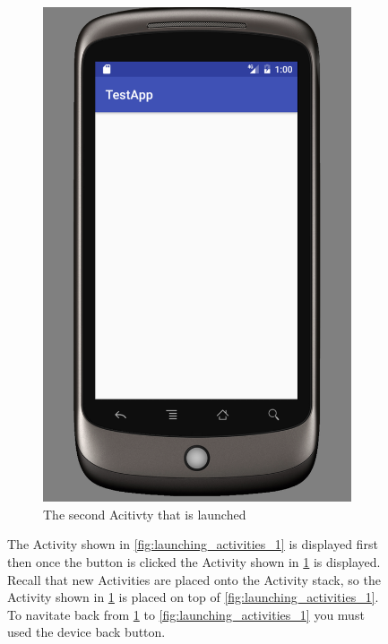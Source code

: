 \begin{figure}[H]
\begin{subfigure}[b]{0.45\textwidth}
        \includegraphics[width=\textwidth]{images/launching_activities_2}
        \caption{The second Acitivty that is launched}
        \label{fig:launching_activities_2}
    \end{subfigure}
\caption{The Activity shown in \ref{fig:launching_activities_1} is displayed first then once the button is clicked the Activity shown in \ref{fig:launching_activities_2} is displayed. Recall that new Activities are placed onto the Activity stack, so the Activity shown in \ref{fig:launching_activities_2} is placed on top of \ref{fig:launching_activities_1}. To navitate back from \ref{fig:launching_activities_2} to \ref{fig:launching_activities_1} you must used the device back button. }
\label{fig:launching_activities}
\end{figure}



